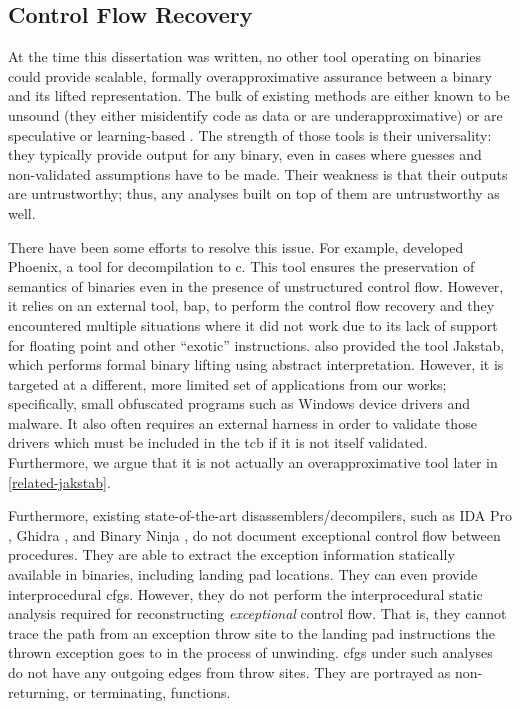 \subsection{Control Flow Recovery}
At the time this dissertation was written, no other tool operating on binaries could provide scalable, formally overapproximative assurance between a binary and its lifted representation.
The bulk of existing methods are either known to be unsound (they either misidentify code as data or are underapproximative) \autocite{schwartz2002disassembly} or are speculative or learning-based \autocite{wartell2011differentiating,khadra2016speculative,katz2018recurrent}.
The strength of those tools is their universality: they typically provide output for any binary, even in cases where guesses and non-validated assumptions have to be made.
Their weakness is that their outputs are untrustworthy; thus, any analyses built on top of them are untrustworthy as well.

There have been some efforts to resolve this issue.
For example, \textcite{brumley2013native} developed Phoenix, a tool for decompilation to \gls{c}.
This tool ensures the preservation of semantics of binaries even in the presence of unstructured control flow.
However, it relies on an external tool, \ac{bap}, to perform the control flow recovery and they encountered multiple situations where it did not work due to its lack of support for floating point and other ``exotic'' instructions.
\Textcite{kinder2010static,kinder2012alternating,kinder2012virtualization} also provided the tool Jakstab, which performs formal binary lifting using abstract interpretation.
However, it is targeted at a different, more limited set of applications from our works; specifically, small obfuscated programs such as Windows device drivers and malware.
It also often requires an external harness in order to validate those drivers which must be included in the \ac{tcb} if it is not itself validated.
Furthermore, we argue that it is not actually an overapproximative tool later in \cref{related-jakstab}.

Furthermore, existing state-of-the-art disassemblers/decompilers, such as IDA Pro \autocite{ida}, Ghidra \autocite{ghidra}, and Binary Ninja \autocite{binary-ninja}, do not document exceptional control flow between procedures.
They are able to extract the exception information statically available in binaries, including landing pad locations.
They can even provide interprocedural \acp{cfg}.
However, they do not perform the interprocedural static analysis required for reconstructing \emph{exceptional} control flow.
That is, they cannot trace the path from an exception throw site to the landing pad instructions the thrown exception goes to in the process of unwinding.
\Acp{cfg} under such analyses do not have any outgoing edges from throw sites.
They are portrayed as non-returning, or terminating, functions.


